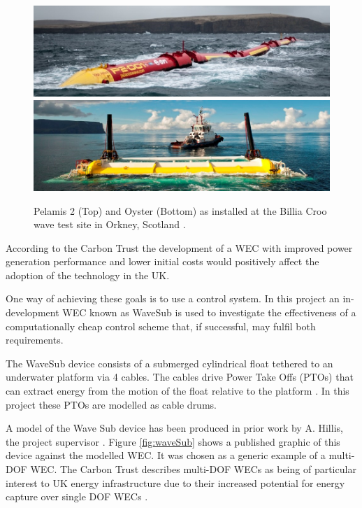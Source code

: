 \documentclass{report}
\begin{document}
\begin{figure}
\centering
\includegraphics[height=0.2\textwidth]{graphics/pelamis}
\includegraphics[height=0.2\textwidth]{graphics/oyster}
\caption{Pelamis 2 (Top) and Oyster (Bottom) as installed at the Billia Croo wave test site in Orkney, Scotland \cite{europeanMarineEnergyCenter}.}
\label{previousWECs}
\end{figure}

\FloatBarrier

According to the Carbon Trust \cite{carbonTrust} the development of a WEC with improved power generation performance and lower initial costs would positively affect the adoption of the technology in the UK.

One way of achieving these goals is to use a control system. In this project an in-development WEC known as WaveSub\cite{waveSub} is used to investigate the effectiveness of a computationally cheap control scheme that, if successful, may fulfil both requirements.

The WaveSub device consists of a submerged cylindrical float tethered to an underwater platform via 4 cables\cite{waveSub}. The cables drive Power Take Offs (PTOs) that can extract energy from the motion of the float relative to the platform \cite{waveSub}. In this project these PTOs are modelled as cable drums.

A model of the Wave Sub device has been produced in prior work by A. Hillis, the project supervisor \cite{andyMPC}. Figure \ref{fig:waveSub} shows a published graphic\cite{waveSub} of this device against the modelled WEC\cite{andyMPC}. It was chosen as a generic example of a multi-DOF WEC. The Carbon Trust describes multi-DOF WECs as being of particular interest to UK energy infrastructure due to their increased potential for energy capture over single DOF WECs \cite{carbonTrust}.
\end{document}
